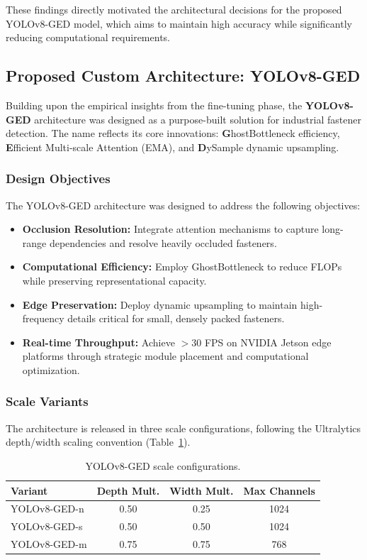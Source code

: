 These findings directly motivated the architectural decisions for the proposed YOLOv8-GED model, which aims to maintain high accuracy while significantly reducing computational requirements.

\subsection{Proposed Custom Architecture: YOLOv8-GED}
\label{subsec:proposed_arch}

Building upon the empirical insights from the fine-tuning phase, the \textbf{YOLOv8-GED} architecture was designed as a purpose-built solution for industrial fastener detection. The name reflects its core innovations: \textbf{G}hostBottleneck efficiency, \textbf{E}fficient Multi-scale Attention (EMA), and \textbf{D}ySample dynamic upsampling.

\subsubsection{Design Objectives}

The YOLOv8-GED architecture was designed to address the following objectives:
\begin{itemize}
    \item \textbf{Occlusion Resolution:} Integrate attention mechanisms to capture long-range dependencies and resolve heavily occluded fasteners.
    \item \textbf{Computational Efficiency:} Employ GhostBottleneck to reduce FLOPs while preserving representational capacity.
    \item \textbf{Edge Preservation:} Deploy dynamic upsampling to maintain high-frequency details critical for small, densely packed fasteners.
    \item \textbf{Real-time Throughput:} Achieve $>30$ FPS on NVIDIA Jetson edge platforms through strategic module placement and computational optimization.
\end{itemize}

\subsubsection{Scale Variants}

The architecture is released in three scale configurations, following the Ultralytics depth/width scaling convention (Table~\ref{tab:scales}).

\begin{table}[htbp]
\centering
\caption{YOLOv8-GED scale configurations.}
\label{tab:scales}
\begin{tabular}{lccc}
\toprule
\textbf{Variant} & \textbf{Depth Mult.} & \textbf{Width Mult.} & \textbf{Max Channels} \\ \midrule
YOLOv8-GED-n & 0.50 & 0.25 & 1024 \\
YOLOv8-GED-s & 0.50 & 0.50 & 1024 \\
YOLOv8-GED-m & 0.75 & 0.75 & 768  \\ \bottomrule
\end{tabular}
\end{table}

